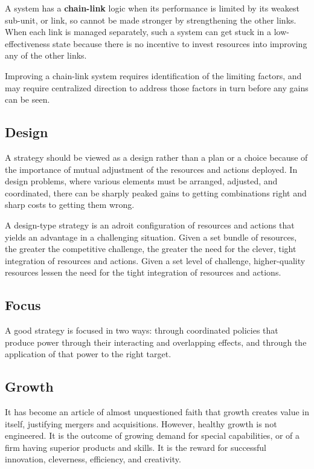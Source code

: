 \documentclass{article}
\begin{document}
\begin{multicols}{2}
A system has a \textbf{chain-link} logic when its performance is limited by its weakest sub-unit, or link, so cannot be made stronger by strengthening the other links. When each link is managed separately, such a system can get stuck in a low-effectiveness state because there is no incentive to invest resources into improving any of the other links.

Improving a chain-link system requires identification of the limiting factors, and may require centralized direction to address those factors in turn before any gains can be seen.

\subsection{Design}

A strategy should be viewed as a design rather than a plan or a choice because of the importance of mutual adjustment of the resources and actions deployed. In design problems, where various elements must be arranged, adjusted, and coordinated, there can be sharply peaked gains to getting combinations right and sharp costs to getting them wrong.

A design-type strategy is an adroit configuration of resources and actions that yields an advantage in a challenging situation. Given a set bundle of resources, the greater the competitive challenge, the greater the need for the clever, tight integration of resources and actions. Given a set level of challenge, higher-quality resources lessen the need for the tight integration of resources and actions.

\subsection{Focus}

A good strategy is focused in two ways: through coordinated policies that produce power through their interacting and overlapping effects, and through the application of that power to the right target.

\subsection{Growth}

It has become an article of almost unquestioned faith that growth creates value in itself, justifying mergers and acquisitions. However, healthy growth is not engineered. It is the outcome of growing demand for special capabilities, or of a firm having superior products and skills. It is the reward for successful innovation, cleverness, efficiency, and creativity.


\end{multicols}
\end{document}
